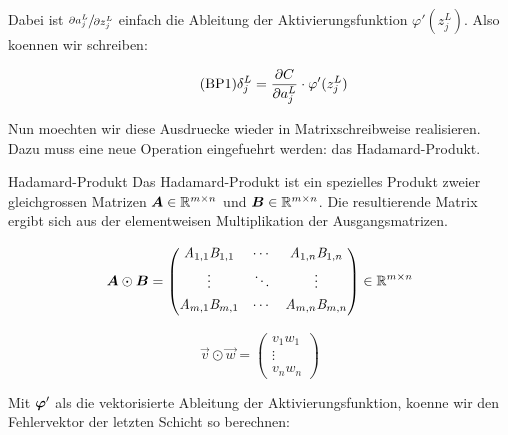 \documentclass[../main]{subfiles}
\begin{document}
Dabei ist $\sfrac{\partial a_j^L}{\partial z_j^L}$ einfach die Ableitung der Aktivierungsfunktion
$\varphi'(z_j^L)$. Also koennen wir schreiben:

\begin{equation}\tag{BP1}
  \delta_j^L = \frac{\partial C}{\partial a_j^L} \cdot \varphi'(z_j^L)
\end{equation}

Nun moechten wir diese Ausdruecke wieder in Matrixschreibweise realisieren. Dazu
muss eine neue Operation eingefuehrt werden: das Hadamard-Produkt.

\begin{defbox}{Hadamard-Produkt}
  Das Hadamard-Produkt ist ein spezielles Produkt zweier gleichgrossen Matrizen
  $\bm{A} \in \mathbb{R}^{m \times n}$ und $\bm{B} \in \mathbb{R}^{m \times n}$.
  Die resultierende Matrix ergibt sich aus der elementweisen Multiplikation der Ausgangsmatrizen.

  \begin{minipage}{0.5\textwidth}
    \begin{equation*}
      \bm{A} \odot \bm{B} =
      \begin{pmatrix}
        \mathit{A}_{1,1} \mathit{B}_{1,1} & \cdots & \mathit{A}_{1,n} \mathit{B}_{1,n} \\[0.3em]
        \vdots & \ddots & \vdots \\[0.3em]
        \mathit{A}_{m,1} \mathit{B}_{m,1} & \cdots & \mathit{A}_{m,n} \mathit{B}_{m,n} \\[0.3em]
      \end{pmatrix}
      \in \mathbb{R}^{m \times n}
    \end{equation*}
  \end{minipage}
  \begin{minipage}{0.5\textwidth}
    \begin{equation*}
      \vec{v} \odot \vec{w} =
      \begin{pmatrix}
        v_1 w_1 \\
        \vdots \\
        v_n w_n
      \end{pmatrix}
    \end{equation*}

  \end{minipage}
\end{defbox}
\para{}

Mit $\bm{\varphi}'$ als die vektorisierte Ableitung der Aktivierungsfunktion,
koenne wir den Fehlervektor der letzten Schicht so berechnen:
\end{document}
